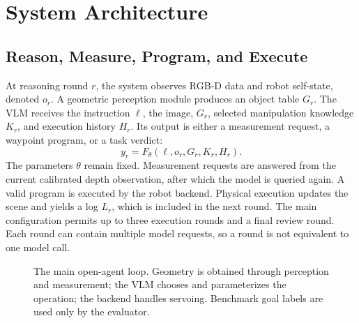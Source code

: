 \section{System Architecture}
\label{sec:method}

\subsection{Reason, Measure, Program, and Execute}
At reasoning round $r$, the system observes RGB-D data and robot self-state, denoted $o_r$. A geometric perception module produces an object table $G_r$. The VLM receives the instruction $\ell$, the image, $G_r$, selected manipulation knowledge $K_r$, and execution history $H_r$. Its output is either a measurement request, a waypoint program, or a task verdict:
\begin{equation}
 y_r = F_\theta(\ell,o_r,G_r,K_r,H_r).
\end{equation}
The parameters $\theta$ remain fixed. Measurement requests are answered from the current calibrated depth observation, after which the model is queried again. A valid program is executed by the robot backend. Physical execution updates the scene and yields a log $L_r$, which is included in the next round. The main configuration permits up to three execution rounds and a final review round. Each round can contain multiple model requests, so a round is not equivalent to one model call.

\begin{figure}[t]
\centering
{}
\caption{The main open-agent loop. Geometry is obtained through perception and measurement; the VLM chooses and parameterizes the operation; the backend handles servoing. Benchmark goal labels are used only by the evaluator.}
\label{fig:architecture}
\end{figure}

